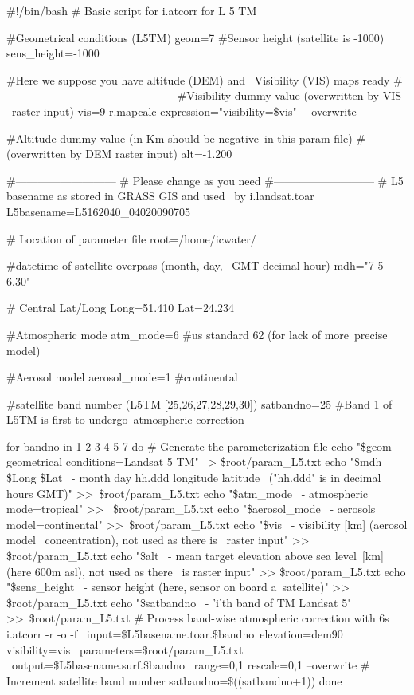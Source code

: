 \begin{smallverbatim}
#!/bin/bash
# Basic script for i.atcorr for L 5 TM

#Geometrical conditions (L5TM)
geom=7
#Sensor height (satellite is -1000)
sens_height=-1000

#Here we suppose you have altitude (DEM) and \
 Visibility (VIS) maps ready
#--------------------------------------------- 
#Visibility dummy value (overwritten by VIS \
 raster input)
vis=9
r.mapcalc expression="visibility=\$vis" \
 --overwrite

#Altitude dummy value (in Km should be negative\
 in this param file)
#(overwritten by DEM raster input)
alt=-1.200

#---------------------------
# Please change as you need
#---------------------------
# L5 basename as stored in GRASS GIS and used \
 by i.landsat.toar
L5basename=L5162040\_04020090705

# Location of parameter file
root=/home/icwater/

#datetime of satellite overpass (month, day, \
 GMT decimal hour)
mdh="7 5 6.30"

# Central Lat/Long
Long=51.410
Lat=24.234

#Atmospheric mode
atm\_mode=6 #us standard 62 (for lack of more\
 precise model)

#Aerosol model
aerosol\_mode=1 #continental

#satellite band number (L5TM [25,26,27,28,29,30])
satbandno=25 #Band 1 of L5TM is first to undergo\
 atmospheric correction

for bandno in 1 2 3 4 5 7
do # Generate the parameterization file
	echo "\$geom                            \
         - geometrical conditions=Landsat 5 TM" \
         > \$root/param\_L5.txt
	echo "\$mdh \$Long \$Lat   \
         - month day hh.ddd longitude latitude \
         ("hh.ddd" is in decimal hours GMT)" >>\
         \$root/param\_L5.txt
	echo "\$atm\_mode                       \
         - atmospheric mode=tropical" >> \
         \$root/param\_L5.txt
	echo "\$aerosol\_mode                   \
         - aerosols model=continental" >>\
         \$root/param\_L5.txt
	echo "\$vis                           \
         - visibility [km] (aerosol model \
         concentration), not used as there is \
         raster input" >> \$root/param\_L5.txt
	echo "\$alt                       \
         - mean target elevation above sea level\
         [km] (here 600m asl), not used as there \
         is raster input" >> \$root/param\_L5.txt
	echo "\$sens\_height                     \
         - sensor height (here, sensor on board a\
         satellite)" >> \$root/param\_L5.txt
	echo "\$satbandno                        \
         - 'i'th band of TM Landsat 5" >>\
         \$root/param\_L5.txt
	# Process band-wise atmospheric correction with 6s
	i.atcorr -r -o -f \
         input=\$L5basename.toar.\$bandno\
         elevation=dem90 visibility=vis \
         parameters=\$root/param\_L5.txt \
         output=\$L5basename.surf.\$bandno \
         range=0,1 rescale=0,1 --overwrite
	# Increment satellite band number 
	satbandno=\$((satbandno+1))
done  
\end{smallverbatim}


\address{GRASS Development Team\\
  \url{http://grass.osgeo.org}\\
  \email{tmitchell@osgeo.org}}


